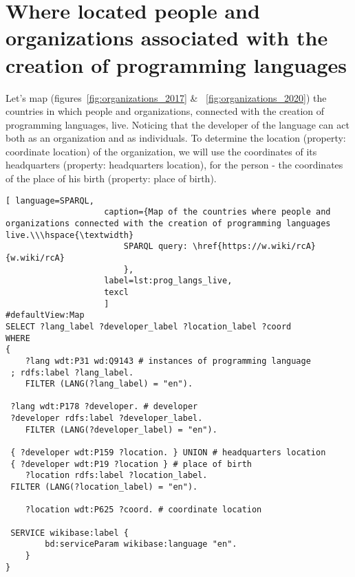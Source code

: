 \section{Where located people and organizations associated with the creation of programming languages}

Let's map (figures~\ref{fig:organizations_2017} \& ~\ref{fig:organizations_2020}) the countries in which people and organizations, connected with the creation of programming languages, live. Noticing that the developer of the language can act both as an organization and as individuals. To determine the location (property: coordinate location) of the organization, we will use the coordinates of its headquarters (property: headquarters location), for the person - the coordinates of the place of his birth (property: place of birth).

\begin{lstlisting}[ language=SPARQL, 
                    caption={Map of the countries where people and organizations connected with the creation of programming languages live.\\\hspace{\textwidth}
                        SPARQL query: \href{https://w.wiki/rcA}{w.wiki/rcA}
                        },
                    label=lst:prog_langs_live,
                    texcl 
                    ]
#defaultView:Map
SELECT ?lang_label ?developer_label ?location_label ?coord
WHERE
{
 	?lang wdt:P31 wd:Q9143 # instances of programming language
 ; rdfs:label ?lang_label. 
 	FILTER (LANG(?lang_label) = "en"). 
 
 ?lang wdt:P178 ?developer. # developer
 ?developer rdfs:label ?developer_label. 
 	FILTER (LANG(?developer_label) = "en"). 
 		
 { ?developer wdt:P159 ?location. } UNION # headquarters location
 { ?developer wdt:P19 ?location } # place of birth
 	?location rdfs:label ?location_label. 
 FILTER (LANG(?location_label) = "en").
 
 	?location wdt:P625 ?coord. # coordinate location

 SERVICE wikibase:label {
		bd:serviceParam wikibase:language "en".
	} 	
}
\end{lstlisting}%

\label{question:prog_lang_2}

